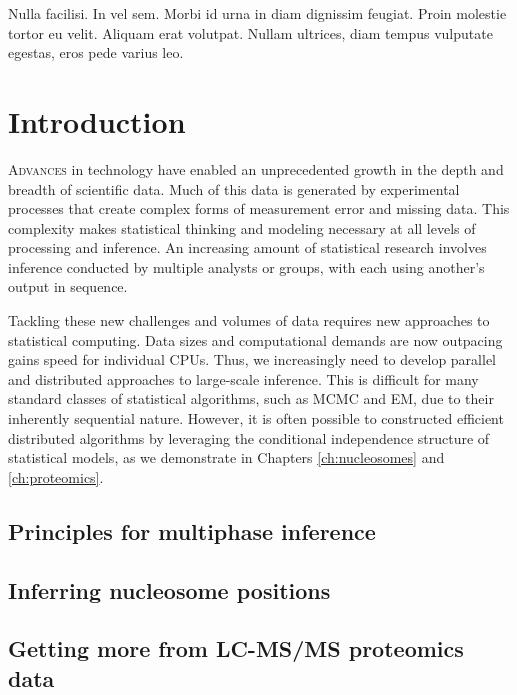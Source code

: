 
\begin{savequote}[75mm] 
Nulla facilisi. In vel sem. Morbi id urna in diam dignissim feugiat. Proin molestie tortor eu velit. Aliquam erat volutpat. Nullam ultrices, diam tempus vulputate egestas, eros pede varius leo.
\end{savequote}

\chapter{Introduction}

\lettrine{A}{dvances} in technology have enabled an unprecedented growth in the depth and breadth of scientific data.
Much of this data is generated by experimental processes that create complex forms of measurement error and missing data.
This complexity makes statistical thinking and modeling necessary at all levels of processing and inference.
An increasing amount of statistical research involves inference conducted by multiple analysts or groups, with each using another's output in sequence.

Tackling these new challenges and volumes of data requires new approaches to statistical computing.
Data sizes and computational demands are now outpacing gains speed for individual CPUs.
Thus, we increasingly need to develop parallel and distributed approaches to large-scale inference.
This is difficult for many standard classes of statistical algorithms, such as MCMC and EM, due to their inherently sequential nature.
However, it is often possible to constructed efficient distributed algorithms by leveraging the conditional independence structure of statistical models, as we demonstrate in Chapters \ref{ch:nucleosomes} and \ref{ch:proteomics}.

\section{Principles for multiphase inference}




\section{Inferring nucleosome positions}



\section{Getting more from LC-MS/MS proteomics data}


